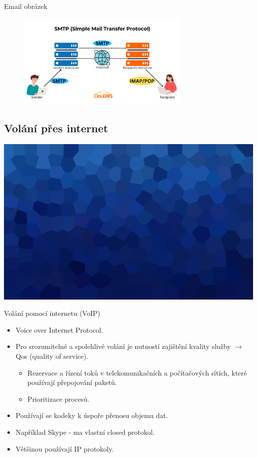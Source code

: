 \documentclass[aspectratio=169,xcolor=dvipsnames, t]{beamer}
\begin{document}
\begin{frame}{Email obrázek}
    \begin{figure}
        \includegraphics[width=0.75\textwidth]{SMTP}
    \end{figure}
    
\end{frame}

\subsection{Volání přes internet}
{
    \includegraphics[width=\paperwidth,height=\paperheight]{AICStyleData/logos/mene_polygonu_bg.png}
}
\begin{frame}{Volání pomocí internetu (VoIP)}
    \begin{itemize}
        \item Voice over Internet Protocol.
        \item Pro srozumitelné a spolehlivé volání je nutností zajištění kvality služby $\rightarrow$ Qos (quality of service).
        \begin{itemize}
            \item Rezervace a řízení toků v  telekomunikačních a počítačových sítích, které používají přepojování paketů.
            \item Prioritizace procesů.
        \end{itemize}
        \item Používají se kodeky k úspoře přenosu objemu dat.
        \item Například Skype - ma vlastní closed protokol.
        \item Většinou používají IP protokoly.
    \end{itemize}

\end{frame}
\end{document}

